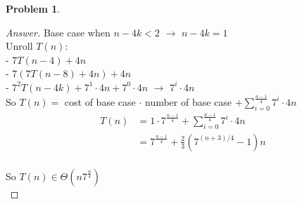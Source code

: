 \documentclass[11pt]{article}
\theoremstyle{definition}
\theoremstyle{definition}
\newtheorem{required}{Problem}
\theoremstyle{definition}
\begin{document}
\begin{required}
\begin{enumerate}
\begin{proof}[Answer] 
	Base case when $n - 4k < 2$ $\rightarrow$ $n - 4k = 1$\\
	
	Unroll $T(n)$:\\
	- $7T(n - 4) + 4n$\\
	- $7(7T(n - 8) + 4n) + 4n$\\
	- $7^2T(n - 4k) + 7^1 \cdot 4n + 7^0 \cdot 4n$ $\rightarrow$ $7^i \cdot 4n$\\
	
	So $T(n) =$ cost of base case $\cdot$ number of base case $+ \displaystyle\sum_{i=0} ^{\frac{n - 1}{4}} 7^i \cdot 4n$\\
	
	\begin{align}
		T(n) &= 1 \cdot 7^{\frac{n - 1}{4}} + \displaystyle\sum_{i=0} ^{\frac{n - 1}{4}} 7^i \cdot 4n\\
		&=7^{\frac{n - 1}{4}} + \frac{2}{3}(7^{(n + 3)/4}- 1)n\\
	\end{align}

So $T(n) \in \Theta(n7^{\frac{n}{4}})$\\

\end{proof}
\end{enumerate}
\end{required}
\end{document}
